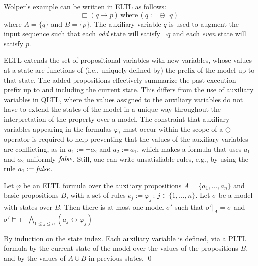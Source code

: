 \noindent
Wolper's example can be written in ELTL
as follows:
\begin{equation} 
\label{form3}
\Box ( q \rightarrow p ) \, \mathrm{where} \, 
 ( q := \ominus \neg q)
\end{equation}
where $A = \{ q\}$ and $B = \{ p \}$.
The auxiliary variable $q$ is used to augment the input sequence such that each {\em odd} state will satisfy $\neg q$
and each {\em even} state will satisfy $p$.  


ELTL extends the set of propositional variables with new variables, whose values at a state are
functions of (i.e., uniquely defined by) the prefix of the model up to that state. The added propositions effectively summarize the past execution prefix up to and
including the current state.
This differs from 
the use of auxiliary variables in QLTL, where the values assigned to the
auxiliary variables do not have to extend the 
states of the model in a unique way throughout the interpretation of 
the property over a model. The constraint that auxiliary variables appearing in the formulas $\varphi_i$ 
must occur within the scope of a $\ominus$ operator
is required to help preventing that the values
of the auxiliary variables are conflicting, as in
$a_1 := \neg a_2$ and $a_2 := a_1$, which makes a formula
that uses $a_1$ and $a_2$ uniformly $\mathit{false}$. Still, one can write unsatisfiable rules, e.g., by using the rule $a_1 : = \mathit{false}$.

\begin{lemma} \label{fourone}
Let $\varphi$ be an ELTL formula
over the auxiliary propositions $A = \{ a_1 , \ldots , a_n \}$ and basic propositions $B$, with
a set of rules $a_j  := \varphi_j \, : \, 
 {j \in \{1, \ldots , n\}}$. 
Let $\sigma$ be a model with states over $B$. 
Then there is at most one
model $\sigma'$ such that $\sigma' |_A = \sigma$ and $\sigma' \models \Box \bigwedge_{1 \leq j \leq n} ( a_j \leftrightarrow \varphi_j) $


\end{lemma}


 By induction on the state index. Each auxiliary variable
is defined, via a PLTL formula by the current state of the model over the values of the propositions $B$, and by the values of $A \cup B$ in previous states.  \qed



